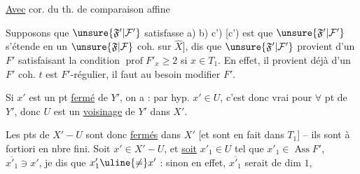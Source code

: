 

\uline{Avec} cor.  du th. de comparaison affine

Supposons que $\unsure{\mathfrak F'|\mathcal F'}$ satisfasse a) b) c')
[c') est que $\unsure{\mathfrak F'|\mathcal F'}$ s'étende en un
$\unsure{\mathfrak F|\mathcal F}$ coh. sur $\hat X$], 
dis que $\unsure{\mathfrak F'|\mathcal F'}$ provient d'un $F'$ satisfaisant la
condition $\operatorname{prof}F'_x\ge2$ si $x\in T_1$.
En effet,
il provient déjà d'un $F'$ coh. 
$t$ est $F'$-régulier, il faut au besoin modifier $F'$.




Si $x'$ est
un pt \uline{fermé} de  $Y'$, on a : par hyp.
$x'\in U$, c'est donc vrai pour $\forall$ pt de $Y'$,
donc $U$ est un \uline{voisinage} de $Y'$ dans $X'$.

Les pts de $X'-U$ sont donc \uline{fermés} dans $X'$
[et sont en fait dans $T_1$] -- ils sont à
fortiori en nbre fini. Soit $x'\in X'-U$, et
\uline{soit} 
$x'_1\in U$ tel que $x'_1\in\operatorname{Ass}F'$,
$\overline{x'_1}\ni x'$, je dis que 
$x'_1\uline{\ne}x'$ : sinon en effet, $\overline{x'_1}$ serait de dim $1$,

